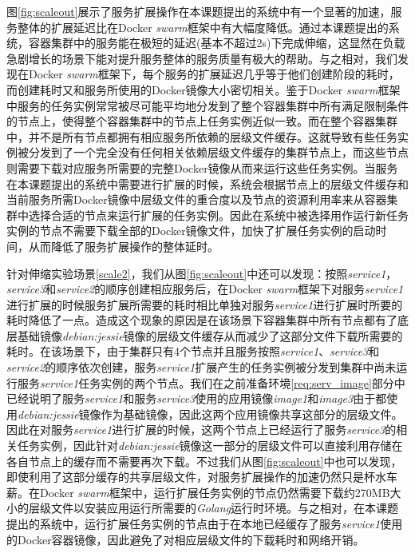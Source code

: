 图\ref{fig:scaleout}展示了服务扩展操作在本课题提出的系统中有一个显著的加速，服务整体的扩展延迟比在Docker \emph{swarm}框架中有大幅度降低。通过本课题提出的系统，容器集群中的服务能在极短的延迟(基本不超过2s)下完成伸缩，这显然在负载急剧增长的场景下能对提升服务整体的服务质量有极大的帮助。与之相对，我们发现在Docker \emph{swarm}框架下，每个服务的扩展延迟几乎等于他们创建阶段的耗时，而创建耗时又和服务所使用的Docker镜像大小密切相关。鉴于Docker \emph{swarm}框架中服务的任务实例常常被尽可能平均地分发到了整个容器集群中所有满足限制条件的节点上，使得整个容器集群中的节点上任务实例近似一致。而在整个容器集群中，并不是所有节点都拥有相应服务所依赖的层级文件缓存。这就导致有些任务实例被分发到了一个完全没有任何相关依赖层级文件缓存的集群节点上，而这些节点则需要下载对应服务所需要的完整Docker镜像从而来运行这些任务实例。当服务在本课题提出的系统中需要进行扩展的时候，系统会根据节点上的层级文件缓存和当前服务所需Docker镜像中层级文件的重合度以及节点的资源利用率来从容器集群中选择合适的节点来运行扩展的任务实例。因此在系统中被选择用作运行新任务实例的节点不需要下载全部的Docker镜像文件，加快了扩展任务实例的启动时间，从而降低了服务扩展操作的整体延时。

针对伸缩实验场景\ref{scale2}，我们从图\ref{fig:scaleout}中还可以发现：按照\emph{service1}，\emph{service3}和\emph{service2}的顺序创建相应服务后，在Docker \emph{swarm}框架下对服务\emph{service1}进行扩展的时候服务扩展所需要的耗时相比单独对服务\emph{service1}进行扩展时所要的耗时降低了一点。造成这个现象的原因是在该场景下容器集群中所有节点都有了底层基础镜像\emph{debian:jessie}镜像的层级文件缓存从而减少了这部分文件下载所需要的耗时。在该场景下，由于集群只有4个节点并且服务按照\emph{service1}、\emph{service3}和\emph{service2}的顺序依次创建，服务\emph{service1}扩展产生的任务实例被分发到集群中尚未运行服务\emph{service1}任务实例的两个节点。我们在之前准备环境\ref{req:serv_image}部分中已经说明了服务\emph{service1}和服务\emph{service3}使用的应用镜像\emph{image1}和\emph{image3}由于都使用\emph{debian:jessie}镜像作为基础镜像，因此这两个应用镜像共享这部分的层级文件。因此在对服务\emph{service1}进行扩展的时候，这两个节点上已经运行了服务\emph{service3}的相关任务实例，因此针对\emph{debian:jessie}镜像这一部分的层级文件可以直接利用存储在各自节点上的缓存而不需要再次下载。不过我们从图\ref{fig:scaleout}中也可以发现，即使利用了这部分缓存的共享层级文件，对服务扩展操作的加速仍然只是杯水车薪。在Docker \emph{swarm}框架中，运行扩展任务实例的节点仍然需要下载约270MB大小的层级文件以安装应用运行所需要的\emph{Golang}运行时环境。与之相对，在本课题提出的系统中，运行扩展任务实例的节点由于在本地已经缓存了服务\emph{service1}使用的Docker容器镜像，因此避免了对相应层级文件的下载耗时和网络开销。

